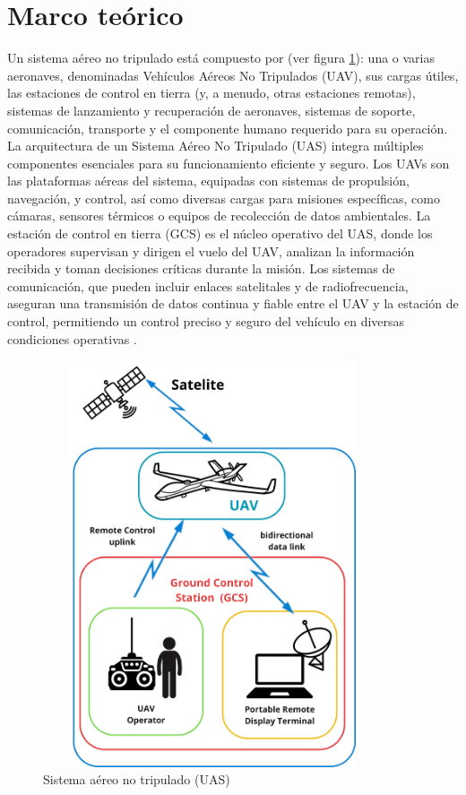 \section{Marco teórico}
\vspace{5 px}
Un sistema aéreo no tripulado está compuesto por (ver figura \ref{fig:UAS}): una o varias aeronaves, denominadas Vehículos Aéreos No Tripulados (UAV), sus cargas útiles, las estaciones de control en tierra (y, a menudo, otras estaciones remotas), sistemas de lanzamiento y recuperación de aeronaves, sistemas de soporte, comunicación, transporte y el componente humano requerido para su operación\cite{UAS-FAC}.  \\



La arquitectura de un Sistema Aéreo No Tripulado (UAS) integra múltiples componentes esenciales para su funcionamiento eficiente y seguro. Los UAVs son las plataformas aéreas del sistema, equipadas con sistemas de propulsión, navegación, y control, así como diversas cargas para misiones específicas, como cámaras, sensores térmicos o equipos de recolección de datos ambientales. La estación de control en tierra (GCS) es el núcleo operativo del UAS, donde los operadores supervisan y dirigen el vuelo del UAV, analizan la información recibida y toman decisiones críticas durante la misión. Los sistemas de comunicación, que pueden incluir enlaces satelitales y de radiofrecuencia, aseguran una transmisión de datos continua y fiable entre el UAV y la estación de control, permitiendo un control preciso y seguro del vehículo en diversas condiciones operativas \cite{UAS-FAC}. \\

\begin{figure}[H]
    \centering
    \includegraphics[width=10cm, height=12cm]{Imagenes/Marco Teorico/UAS.png}
    \caption{ Sistema aéreo no tripulado (UAS)}
    \label{fig:UAS}
\end{figure}


